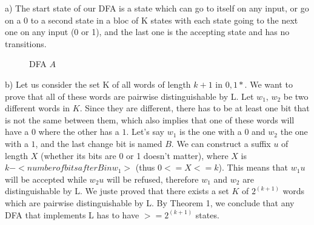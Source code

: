 
a) The start state of our DFA is a state which can go to itself on any input, or go on a 0 to a second state in a bloc of K states with each state going to the next one on any input (0 or 1), and the last one is the accepting state and has no transitions.

\begin{figure}[H]
\centering
{}
\caption{DFA $A$}
\end{figure}

b) Let us consider the set K of all words of length $k+1$ in ${0,1}*$. We want to prove that all of these words are pairwise distinguishable by L. Let $w_1$, $w_2$ be two different words in $K$. Since they are different, there has to be at least one bit that is not the same between them, which also implies that one of these words will have a $0$ where the other has a $1$. Let's say $w_1$ is the one with a $0$ and $w_2$ the one with a $1$, and the last change bit is named $B$. We can construct a suffix $u$ of length $X$ (whether its bits are 0 or 1 doesn't matter), where $X$ is $k - <number of bits after B in w_1>$ (thus $0 <= X <= k$).
This means that $w_1u$ will be accepted while $w_2u$ will be refused, therefore $w_1$ and $w_2$ are distinguishable by L. We juste proved that there exists a set $K$ of $2^{(k+1)}$ words which are pairwise distinguishable by L. By Theorem 1, we conclude that any DFA that implements L has to have $>= 2^{(k+1)}$ states.